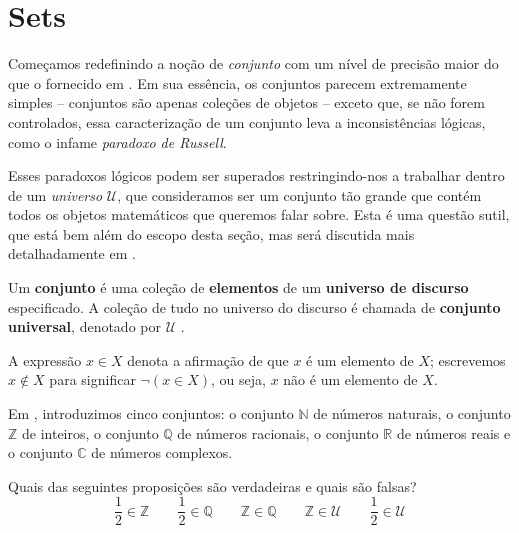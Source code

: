 \section{Sets}

Começamos redefinindo a noção de \textit{conjunto} com um nível de precisão maior do que o fornecido em . Em sua essência, os conjuntos parecem extremamente simples – conjuntos são apenas coleções de objetos – exceto que, se não forem controlados, essa caracterização de um conjunto leva a inconsistências lógicas, como o infame \textit{paradoxo de Russell}.

Esses paradoxos lógicos podem ser superados restringindo-nos a trabalhar dentro de um \textit{universo} $\mathcal{U}$, que consideramos ser um conjunto tão grande que contém todos os objetos matemáticos que queremos falar sobre. Esta é uma questão sutil, que está bem além do escopo desta seção, mas será discutida mais detalhadamente em .

\begin{definition}
\label{defSet}
Um \textbf{conjunto} é uma coleção de \textbf{elementos} de um \textbf{universo de discurso} especificado. A coleção de tudo no universo do discurso é chamada de \textbf{conjunto universal}, denotado por $\mathcal{U}$ .

A expressão $x \in X$  denota a afirmação de que $x$ é um elemento de $ X$; escrevemos $x \not \in X$  para significar $\neg (x \in X)$, ou seja, $x$ não é um elemento de $X$.
\end{definition}

\begin{example}
Em , introduzimos cinco conjuntos: o conjunto $\mathbb{N}$ de números naturais, o conjunto $\mathbb{Z}$ de inteiros, o conjunto $\mathbb{Q}$ de números racionais, o conjunto $\mathbb{R}$ de números reais e o conjunto $\mathbb{C}$ de números complexos.
\end{example}

\begin{exercise}
Quais das seguintes proposições são verdadeiras e quais são falsas?
\[ \frac{1}{2} \in \mathbb{Z} \qquad \frac{1}{2} \in \mathbb{Q} \qquad \mathbb{Z} \in \mathbb{Q} \qquad \mathbb{Z} \in \mathcal{U} \qquad \frac{1}{2} \in \mathcal{U} \]
\end{exercise}

